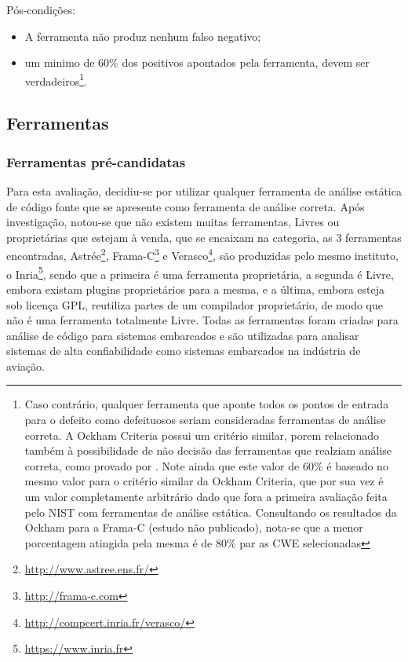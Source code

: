 Pós-condições:
\begin{itemize}
  \item A ferramenta não produz nenhum falso negativo;
  \item um minimo de 60\% dos positivos apontados pela ferramenta, devem ser verdadeiros\footnote{Caso contrário, qualquer ferramenta que aponte todos os pontos de entrada para o defeito como defeituosos seriam consideradas ferramentas de análise correta. A Ockham Criteria possui um critério similar, porem relacionado também à possibilidade de não decisão das ferramentas que realziam análise correta, como provado por \cite{rice}. Note ainda que este valor de 60\% é baseado no mesmo valor para o critério similar da Ockham Criteria, que por sua vez é um valor completamente arbitrário dado que fora a primeira avaliação feita pelo NIST com ferramentas de análise estática. Consultando os resultados da Ockham para a Frama-C (estudo não publicado), nota-se que a menor porcentagem atingida pela mesma é de 80\% par as CWE selecionadas}.
\end{itemize}

\subsection{Ferramentas}

\subsubsection{Ferramentas pré-candidatas}

Para esta avaliação, decidiu-se por utilizar qualquer ferramenta de análise estática de código fonte que se apresente como ferramenta de análise correta. Após investigação, notou-se que não existem muitas ferramentas, Livres ou proprietárias que estejam à venda, que se encaixam na categoria, as 3 ferramentas encontradas, Astrée\footnote{\url{http://www.astree.ens.fr/}}, Frama-C\footnote{\url{http://frama-c.com}} e Verasco\footnote{\url{http://compcert.inria.fr/verasco/}}, são produzidas pelo mesmo instituto, o Inria\footnote{\url{https://www.inria.fr}}, sendo que a primeira é uma ferramenta proprietária, a segunda é Livre, embora existam plugins proprietários para a mesma, e a última, embora esteja sob licença GPL, reutiliza partes de um compilador proprietário, de modo que não é uma ferramenta totalmente Livre. Todas as ferramentas foram criadas para análise de código para sistemas embarcados e são utilizadas para analisar sistemas de alta confiabilidade como sistemas embarcados na indústria de aviação.

